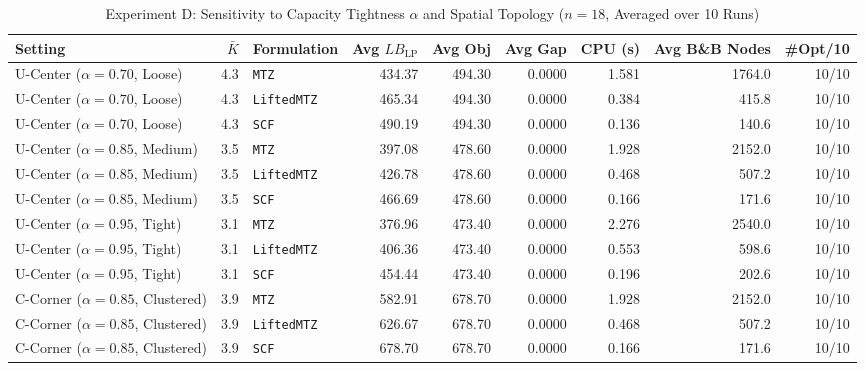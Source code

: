 \documentclass[11pt,a4paper]{article}
\begin{document}
\begin{table}[htbp]
\centering
\caption{Experiment D: Sensitivity to Capacity Tightness $\alpha$ and Spatial Topology ($n = 18$, Averaged over 10 Runs)}
\label{tab:sensitivity}
\footnotesize
\begin{tabular}{lrlrrrrrr}
\toprule
Setting & $\bar{K}$ & Formulation & Avg $LB_{\text{LP}}$ & Avg Obj & Avg Gap & CPU (s) & Avg B\&B Nodes & \#Opt/10 \\
\midrule
U-Center ($\alpha=0.70$, Loose) & 4.3 & \texttt{MTZ} & 434.37 & 494.30 & 0.0000 & 1.581 & 1764.0 & 10/10 \\
U-Center ($\alpha=0.70$, Loose) & 4.3 & \texttt{LiftedMTZ} & 465.34 & 494.30 & 0.0000 & 0.384 & 415.8 & 10/10 \\
U-Center ($\alpha=0.70$, Loose) & 4.3 & \texttt{SCF} & 490.19 & 494.30 & 0.0000 & 0.136 & 140.6 & 10/10 \\
\midrule
U-Center ($\alpha=0.85$, Medium) & 3.5 & \texttt{MTZ} & 397.08 & 478.60 & 0.0000 & 1.928 & 2152.0 & 10/10 \\
U-Center ($\alpha=0.85$, Medium) & 3.5 & \texttt{LiftedMTZ} & 426.78 & 478.60 & 0.0000 & 0.468 & 507.2 & 10/10 \\
U-Center ($\alpha=0.85$, Medium) & 3.5 & \texttt{SCF} & 466.69 & 478.60 & 0.0000 & 0.166 & 171.6 & 10/10 \\
\midrule
U-Center ($\alpha=0.95$, Tight) & 3.1 & \texttt{MTZ} & 376.96 & 473.40 & 0.0000 & 2.276 & 2540.0 & 10/10 \\
U-Center ($\alpha=0.95$, Tight) & 3.1 & \texttt{LiftedMTZ} & 406.36 & 473.40 & 0.0000 & 0.553 & 598.6 & 10/10 \\
U-Center ($\alpha=0.95$, Tight) & 3.1 & \texttt{SCF} & 454.44 & 473.40 & 0.0000 & 0.196 & 202.6 & 10/10 \\
\midrule
C-Corner ($\alpha=0.85$, Clustered) & 3.9 & \texttt{MTZ} & 582.91 & 678.70 & 0.0000 & 1.928 & 2152.0 & 10/10 \\
C-Corner ($\alpha=0.85$, Clustered) & 3.9 & \texttt{LiftedMTZ} & 626.67 & 678.70 & 0.0000 & 0.468 & 507.2 & 10/10 \\
C-Corner ($\alpha=0.85$, Clustered) & 3.9 & \texttt{SCF} & 678.70 & 678.70 & 0.0000 & 0.166 & 171.6 & 10/10 \\
\bottomrule
\end{tabular}
\end{table}
\end{document}
